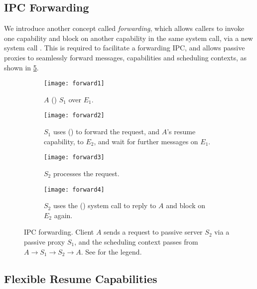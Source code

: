 \subsection{IPC Forwarding}

We introduce another concept called \emph{forwarding}, which allows callers to
invoke one capability and block on another capability in the same system call, via
a new system call \nbsendrecv. This is required to
facilitate a forwarding IPC, and allows passive proxies to seamlessly forward messages,
capabilities and scheduling contexts, as shown in \cref{f:model-forward}. 

\begin{figure}
    \centering
    \begin{subfigure}[h]{0.8\textwidth}
        \centering
        \texttt{[image: forward1]}
        \caption{$A$ \call() $S_{1}$ over $E_{1}$.}
        \label{f:forward1}
    \end{subfigure}
    \begin{subfigure}[h]{0.8\textwidth}
        \centering
        \texttt{[image: forward2]}
        \caption{$S_{1}$ uses \nbsendrecv() to forward the request, and $A$'s resume 
            capability, to $E_{2}$, and
        wait for further messages on $E_{1}$.}
        \label{f:forward2}
    \end{subfigure}
    \begin{subfigure}[h]{0.8\textwidth}
        \centering
        \texttt{[image: forward3]}
        \caption{$S_{2}$ processes the request.}
        \label{f:forward4}
    \end{subfigure}
    \begin{subfigure}[h]{0.8\textwidth}
        \centering
        \texttt{[image: forward4]}
        \caption{$S_{2}$ uses the \replyrecv() system call to reply to $A$ and block on
        $E_{2}$ again. }
        \label{f:forward4}
\end{subfigure}
\caption{IPC forwarding. Client $A$ sends a request to passive server $S_{2}$ via a passive proxy $S_{1}$,
and the scheduling context passes from $A \rightarrow S_{1} \rightarrow S_{2} \rightarrow A$. See  for the legend.}
\label{f:model-forward}
\end{figure}

\subsection{Flexible Resume Capabilities}

